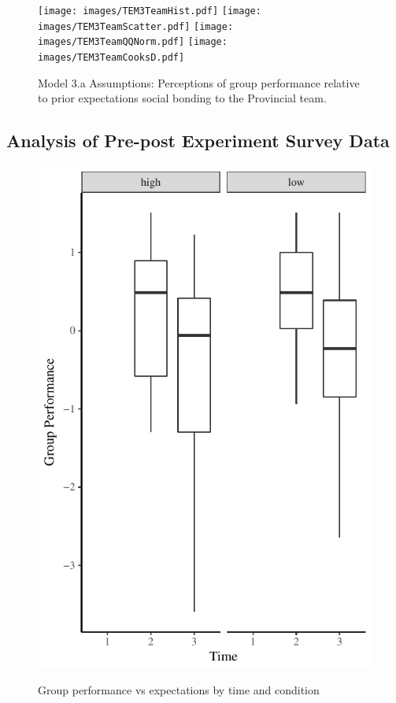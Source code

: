 \begin{figure}[htbp]
    \texttt{[image: images/TEM3TeamHist.pdf]}
    \texttt{[image: images/TEM3TeamScatter.pdf]}
    \texttt{[image: images/TEM3TeamQQNorm.pdf]}
    \texttt{[image: images/TEM3TeamCooksD.pdf]}
    \caption{Model 3.a Assumptions: Perceptions of group performance relative to prior expectations social bonding to the Provincial team.}
    \label{fig:M3TeamAssumptions}
\end{figure}




\subsection{Analysis of Pre-post Experiment Survey Data}






\begin{figure}
  \centering
    \includegraphics[width=0.5\linewidth,keepaspectratio] {images/groupPerfConfPlot}
    \label{fig:groupPerfConfPlot}
    \caption{Group performance vs expectations by time and condition}
\end{figure}


